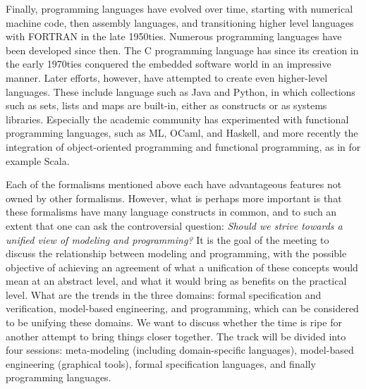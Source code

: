 Finally, programming languages have evolved over time, starting 
with numerical machine code, then assembly languages, and 
transitioning higher level languages with FORTRAN in the late 
1950ties. Numerous programming languages have been developed since 
then. The C programming language has  since its creation in the 
early 1970ties conquered the embedded software world in an 
impressive manner. Later efforts, however, have attempted to
create even higher-level languages. These include language such as
Java and Python, in which collections such as sets, lists and maps 
are built-in, either as constructs or as systems libraries. 
Especially the academic community has experimented with functional 
programming languages, such as ML, OCaml, and Haskell, and more 
recently the integration of object-oriented programming and 
functional programming, as in for example Scala.

Each of the formalisms mentioned above each have advantageous features not owned by other formalisms. However, what is perhaps more important is that these formalisms have many language constructs in common, and to  such an extent that one can ask the controversial question: 
{\em Should we strive towards a unified view of modeling and 
programming?} 
It is the goal of the meeting to discuss the 
relationship between modeling and programming, with the possible 
objective of achieving an agreement of what a unification of these 
concepts would mean at an abstract level, and what it would bring 
as benefits on the practical level. What are the trends in the 
three domains: formal specification and verification,
model-based engineering, and
programming, which can be considered 
to be unifying these domains. We want to discuss whether the time 
is ripe for another attempt to bring things closer together. The 
track will be divided into four sessions: meta-modeling (including 
domain-specific languages), 
model-based engineering (graphical tools), formal specification 
languages, and finally programming languages.